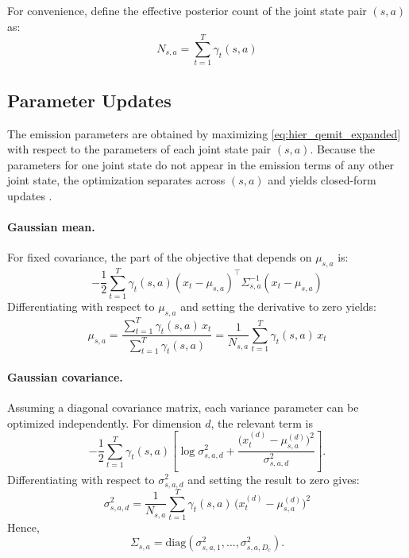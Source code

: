 For convenience, define the effective posterior count of the joint state pair \((s,a)\) as:
\begin{equation}
N_{s,a}
=
\sum_{t=1}^{T}\gamma_t(s,a)
\label{eq:hier_effective_count}
\end{equation}


\subsection{Parameter Updates}

The emission parameters are obtained by maximizing \eqref{eq:hier_qemit_expanded} with respect to 
the parameters of each joint state pair \((s,a)\). Because the parameters for one joint state do not 
appear in the emission terms of any other joint state, the optimization separates across \((s,a)\) 
and yields closed-form updates \cite{Dempster1977,Bilmes1998}.

\paragraph{Gaussian mean.}
For fixed covariance, the part of the objective that depends on \(\mu_{s,a}\) is:
\begin{equation}
-\frac{1}{2}
\sum_{t=1}^{T}
\gamma_t(s,a)
(x_t-\mu_{s,a})^\top
\Sigma_{s,a}^{-1}
(x_t-\mu_{s,a})
\end{equation}
Differentiating with respect to \(\mu_{s,a}\) and setting the derivative to zero yields:
\begin{equation}
\mu_{s,a}
=
\frac{\sum_{t=1}^{T}\gamma_t(s,a)\,x_t}
{\sum_{t=1}^{T}\gamma_t(s,a)}
=
\frac{1}{N_{s,a}}
\sum_{t=1}^{T}\gamma_t(s,a)\,x_t
\label{eq:hier_mean_update}
\end{equation}


\paragraph{Gaussian covariance.}
Assuming a diagonal covariance matrix, each variance parameter can be optimized independently. 
For dimension \(d\), the relevant term is
\begin{equation}
-\frac{1}{2}
\sum_{t=1}^{T}
\gamma_t(s,a)
\left[
\log \sigma^2_{s,a,d}
+
\frac{\bigl(x_t^{(d)}-\mu_{s,a}^{(d)}\bigr)^2}{\sigma^2_{s,a,d}}
\right].
\end{equation}
Differentiating with respect to \(\sigma^2_{s,a,d}\) and setting the result to zero gives:
\begin{equation}
\sigma^2_{s,a,d}
=
\frac{1}{N_{s,a}}
\sum_{t=1}^{T}
\gamma_t(s,a)\,
\bigl(x_t^{(d)}-\mu_{s,a}^{(d)}\bigr)^2
\label{eq:hier_var_update}
\end{equation}
Hence,
\begin{equation}
\Sigma_{s,a}
=
\mathrm{diag}\!\left(\sigma^2_{s,a,1},\dots,\sigma^2_{s,a,D_c}\right).
\end{equation}

